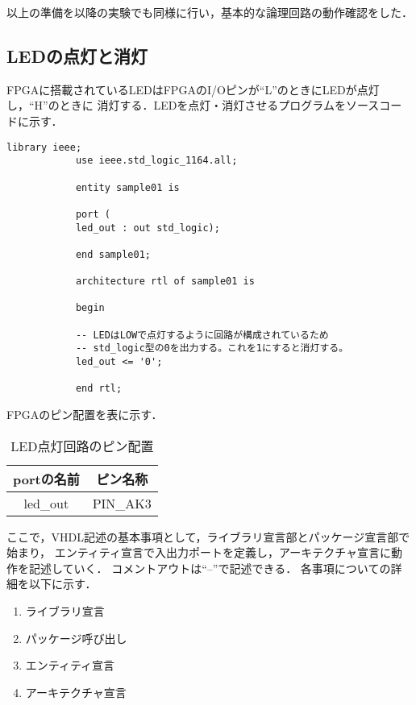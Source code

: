 \documentclass{ltjsarticle}
\begin{document}
		以上の準備を以降の実験でも同様に行い，基本的な論理回路の動作確認をした．

	\subsection{LEDの点灯と消灯}
		FPGAに搭載されているLEDはFPGAのI/Oピンが``L''のときにLEDが点灯し，``H''のときに
		消灯する．LEDを点灯・消灯させるプログラムをソースコードに示す．

		\begin{lstlisting}[caption=sample1, label=code:sample1]
			library ieee;
			use ieee.std_logic_1164.all;

			entity sample01 is

			port (
			led_out : out std_logic);

			end sample01;

			architecture rtl of sample01 is

			begin

			-- LEDはLOWで点灯するように回路が構成されているため
			-- std_logic型の0を出力する。これを1にすると消灯する。
			led_out <= '0';

			end rtl;
		\end{lstlisting}

		FPGAのピン配置を表に示す．

		\begin{table}[H]
		\begin{center}
		\caption{LED点灯回路のピン配置}
		\label{tab:LED1}
		\begin{tabular}{cc} \toprule
			portの名前 & ピン名称 \\ \hline
			led\_out & PIN\_AK3\\
		\bottomrule
		\end{tabular}
		\end{center}
		\end{table}

		ここで，VHDL記述の基本事項として，ライブラリ宣言部とパッケージ宣言部で始まり，
		エンティティ宣言で入出力ポートを定義し，アーキテクチャ宣言に動作を記述していく．
		コメントアウトは``--''で記述できる．
		各事項についての詳細を以下に示す．
	
		\begin{enumerate}
			\item ライブラリ宣言
			\item パッケージ呼び出し
			\item エンティティ宣言
			\item アーキテクチャ宣言
		\end{enumerate}
\end{document}
